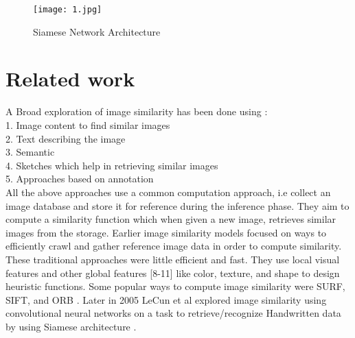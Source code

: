 \documentclass[10pt,twocolumn,letterpaper]{article}
\begin{document}
\begin{figure}[htp]
\centering
\texttt{[image: 1.jpg]}
\caption{Siamese Network Architecture}
\label{fig:captioning}
\end{figure}

\vspace{-2mm}
\section{Related work}
\vspace{-1mm}

A Broad exploration of image similarity has been done using : \\
1. Image content to find similar images \\
2. Text describing the image \\
3. Semantic \\
4. Sketches which help in retrieving similar images \\
5. Approaches based on annotation \cite{c5} \\
All the above approaches use a common computation approach, i.e collect an image database and store it for reference during the inference phase. They aim to compute a similarity function which when given a new image, retrieves similar images from the storage. Earlier image similarity models focused on ways to efficiently crawl and gather reference image data in order to compute similarity. These traditional approaches were little efficient and fast. They use local visual features and other global features [8-11] like color, texture, and shape to design heuristic functions. Some popular ways to compute image similarity were SURF, SIFT, and ORB \cite{c6}. Later in 2005 LeCun et al explored image similarity using convolutional neural networks on a task to retrieve/recognize Handwritten data by using Siamese architecture \cite{c7}.\\
\end{document}
